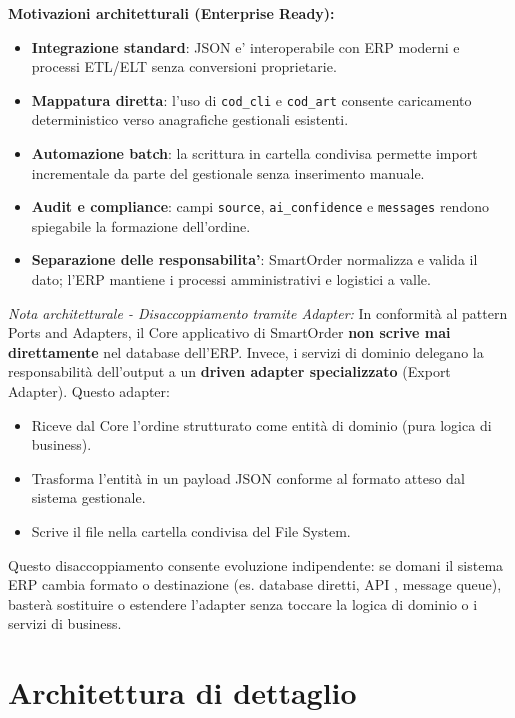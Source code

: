 \documentclass[a4paper, 11pt, oneside]{scrartcl}
\begin{document}
\noindent\textbf{Motivazioni architetturali (Enterprise Ready):}
\begin{itemize}
        \item \textbf{Integrazione standard}: JSON e' interoperabile con ERP moderni e processi ETL/ELT senza conversioni proprietarie.
        \item \textbf{Mappatura diretta}: l'uso di \texttt{cod\_cli} e \texttt{cod\_art} consente caricamento deterministico verso anagrafiche gestionali esistenti.
        \item \textbf{Automazione batch}: la scrittura in cartella condivisa permette import incrementale da parte del gestionale senza inserimento manuale.
        \item \textbf{Audit e compliance}: campi \texttt{source}, \texttt{ai\_confidence} e \texttt{messages} rendono spiegabile la formazione dell'ordine.
        \item \textbf{Separazione delle responsabilita'}: SmartOrder normalizza e valida il dato; l'ERP mantiene i processi amministrativi e logistici a valle.
\end{itemize}

\textit{Nota architetturale - Disaccoppiamento tramite Adapter:} In conformità al pattern Ports and Adapters, il Core applicativo di SmartOrder \textbf{non scrive mai direttamente} nel database dell'ERP. Invece, i servizi di dominio delegano la responsabilità dell'output a un \textbf{driven adapter specializzato} (Export Adapter). Questo adapter:
\begin{itemize}
    \item Riceve dal Core l'ordine strutturato come entità di dominio (pura logica di business).
    \item Trasforma l'entità in un payload JSON conforme al formato atteso dal sistema gestionale.
    \item Scrive il file nella cartella condivisa del File System.
\end{itemize}
Questo disaccoppiamento consente evoluzione indipendente: se domani il sistema ERP cambia formato o destinazione (es. database diretti, API , message queue), basterà sostituire o estendere l'adapter senza toccare la logica di dominio o i servizi di business.

\newpage
\section{Architettura di dettaglio}
\end{document}

